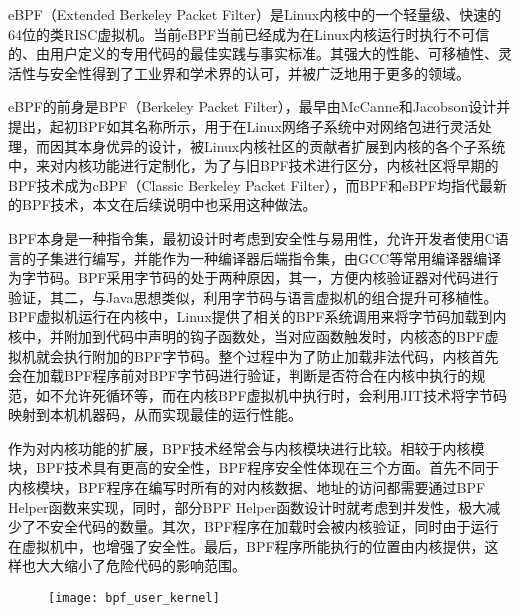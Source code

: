 
eBPF（Extended Berkeley Packet Filter）是Linux内核中的一个轻量级、快速的64位的类RISC虚拟机\citep{sharaf2022extended}。当前eBPF当前已经成为在Linux内核运行时执行不可信的、由用户定义的专用代码的最佳实践与事实标准。其强大的性能、可移植性、灵活性与安全性得到了工业界和学术界的认可，并被广泛地用于更多的领域。

eBPF的前身是BPF（Berkeley Packet Filter），最早由McCanne和Jacobson设计并提出\citep{mccanne1993bsd}，起初BPF如其名称所示，用于在Linux网络子系统中对网络包进行灵活处理，而因其本身优异的设计，被Linux内核社区的贡献者扩展到内核的各个子系统中，来对内核功能进行定制化，为了与旧BPF技术进行区分，内核社区将早期的BPF技术成为cBPF（Classic Berkeley Packet Filter），而BPF和eBPF均指代最新的BPF技术，本文在后续说明中也采用这种做法。

BPF本身是一种指令集，最初设计时考虑到安全性与易用性，允许开发者使用C语言的子集进行编写，并能作为一种编译器后端指令集，由GCC等常用编译器编译为字节码\citep{ebpfguidence}。BPF采用字节码的处于两种原因，其一，方便内核验证器对代码进行验证，其二，与Java思想类似，利用字节码与语言虚拟机的组合提升可移植性。BPF虚拟机运行在内核中，Linux提供了相关的BPF系统调用来将字节码加载到内核中，并附加到代码中声明的钩子函数处，当对应函数触发时，内核态的BPF虚拟机就会执行附加的BPF字节码。整个过程中为了防止加载非法代码，内核首先会在加载BPF程序前对BPF字节码进行验证，判断是否符合在内核中执行的规范，如不允许死循环等，而在内核BPF虚拟机中执行时，会利用JIT技术将字节码映射到本机机器码，从而实现最佳的运行性能。

作为对内核功能的扩展，BPF技术经常会与内核模块进行比较。相较于内核模块，BPF技术具有更高的安全性，BPF程序安全性体现在三个方面。首先不同于内核模块，BPF程序在编写时所有的对内核数据、地址的访问都需要通过BPF Helper函数来实现，同时，部分BPF Helper函数设计时就考虑到并发性，极大减少了不安全代码的数量。其次，BPF程序在加载时会被内核验证，同时由于运行在虚拟机中，也增强了安全性。最后，BPF程序所能执行的位置由内核提供，这样也大大缩小了危险代码的影响范围。

\begin{figure}[!htbp]
    \centering
    \texttt{[image: bpf\_user\_kernel]}
    \label{fig:bpf_user_kernel}
\end{figure}

